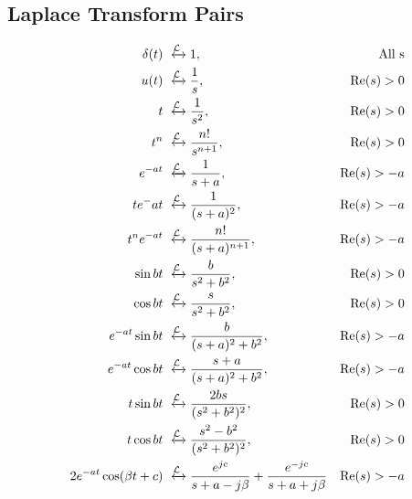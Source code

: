 \subsection{Laplace Transform Pairs}
\begin{align*}
    \delta(t) &\xleftrightarrow{\mathcal{L}} 1, &\text{All s}\\
    u(t) &\xleftrightarrow{\mathcal{L}} \frac{1}{s}, &\text{Re}(s) > 0\\
    t &\xleftrightarrow{\mathcal{L}} \frac{1}{s^2}, &\text{Re}(s) > 0\\
    t^n &\xleftrightarrow{\mathcal{L}} \frac{n!}{s^{n+1}}, &\text{Re}(s) > 0\\
    e^{-at} &\xleftrightarrow{\mathcal{L}} \frac{1}{s+a}, &\text{Re}(s) > -a\\
    te^-{at} &\xleftrightarrow{\mathcal{L}} \frac{1}{(s+a)^2}, &\text{Re}(s) > -a\\
    t^ne^{-at} &\xleftrightarrow{\mathcal{L}} \frac{n!}{(s+a)^{n+1}}, &\text{Re}(s) > -a\\
    \sin bt &\xleftrightarrow{\mathcal{L}} \frac{b}{s^2+b^2}, &\text{Re}(s) > 0\\
    \cos bt &\xleftrightarrow{\mathcal{L}} \frac{s}{s^2+b^2}, &\text{Re}(s) > 0\\
    e^{-at}\sin bt &\xleftrightarrow{\mathcal{L}} \frac{b}{(s+a)^2+b^2}, &\text{Re}(s) > -a\\
    e^{-at}\cos bt &\xleftrightarrow{\mathcal{L}} \frac{s+a}{(s+a)^2+b^2}, &\text{Re}(s) > -a\\
    t\sin bt &\xleftrightarrow{\mathcal{L}} \frac{2bs}{(s^2+b^2)^2}, &\text{Re}(s) > 0\\
    t\cos bt &\xleftrightarrow{\mathcal{L}} \frac{s^2-b^2}{(s^2+b^2)^2}, &\text{Re}(s) > 0\\
    2e^{-at}\cos (\beta t+c) &\xleftrightarrow{\mathcal{L}} \frac{e^{jc}}{s+a-j\beta}+\frac{e^{-jc}}{s+a+j\beta} &\text{Re}(s) > -a
\end{align*}